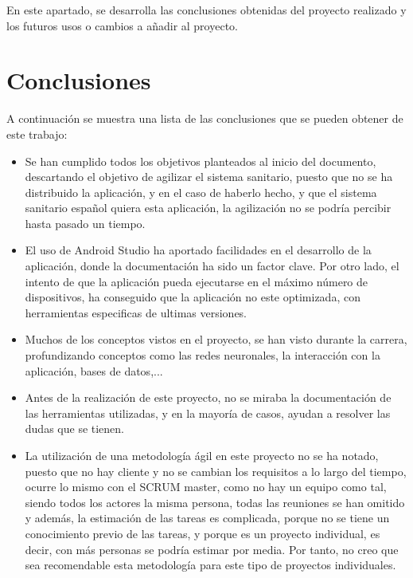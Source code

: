 
En este apartado, se desarrolla las conclusiones obtenidas del proyecto realizado y los futuros usos o cambios a añadir al proyecto.

\section{Conclusiones}

A continuación se muestra una lista de las conclusiones que se pueden obtener de este trabajo:

\begin{itemize}
    \item Se han cumplido todos los objetivos planteados al inicio del documento, descartando el objetivo de agilizar el sistema sanitario, puesto que no se ha distribuido la aplicación, y en el caso de haberlo hecho, y que el sistema sanitario español quiera esta aplicación, la agilización no se podría percibir hasta pasado un tiempo.

    \item El uso de Android Studio ha aportado facilidades en el desarrollo de la aplicación, donde la documentación ha sido un factor clave. Por otro lado, el intento de que la aplicación pueda ejecutarse en el máximo número de dispositivos, ha conseguido que la aplicación no este optimizada, con herramientas especificas de ultimas versiones.

    \item Muchos de los conceptos vistos en el proyecto, se han visto durante la carrera, profundizando conceptos como las redes neuronales, la interacción con la aplicación, bases de datos,...

    \item Antes de la realización de este proyecto, no se miraba la documentación de las herramientas utilizadas, y en la mayoría de casos, ayudan a resolver las dudas que se tienen. 

    \item La utilización de una metodología ágil en este proyecto no se ha notado, puesto que no hay cliente y no se cambian los requisitos a lo largo del tiempo, ocurre lo mismo con el SCRUM master, como no hay un equipo como tal, siendo todos los actores la misma persona, todas las reuniones se han omitido y además, la estimación de las tareas es complicada, porque no se tiene un conocimiento previo de las tareas, y porque es un proyecto individual, es decir, con más personas se podría estimar por media. Por tanto, no creo que sea recomendable esta metodología para este tipo de proyectos individuales.

\end{itemize}

